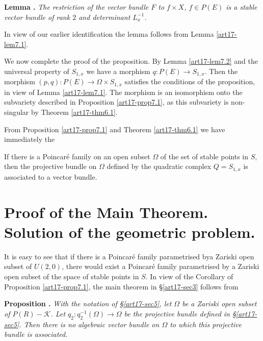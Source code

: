 \medskip
\noindent
{\bf Lemma .\label{art17-lem7.2}}
{\em The restriction of the vector bundle $F$ to $f\times X$, $f\in P(E)$ is a stable vector bundle of rank $2$ and determinant $L^{-1}_{x}$.}
\smallskip

In view of our earlier identification the lemma follows from Lemma \ref{art17-lem7.1}.

We now complete the proof of the proposition. By Lemma \ref{art17-lem7.2} and the universal property of $S_{1,x}$ we have a morphism $q:P(E)\to S_{1,x}$. Then the morphism $(p,q):P(E)\to \Omega\times S_{1,x}$ satisfies the conditions of the proposition, in view of Lemma \ref{art17-lem7.1}. The morphism is an isomorphism onto the subvariety described in Proposition \ref{art17-prop7.1}, as this subvariety is non-singular by Theorem \ref{art17-thm6.1}.

From Proposition \ref{art17-prop7.1} and Theorem \ref{art17-thm6.1} we have immediately the

\begin{coro*}
If there is a Poincar\'e family on an open subset $\Omega$ of the set of stable points in $S$, then the projective bundle on $\Omega$ defined by the quadratic complex $Q=S_{1,x}$ is associated to a vector bundle.
\end{coro*}

\section{Proof of the Main Theorem. Solution of the geometric problem.}\label{art17-sec8}

It is easy to see that if there is a Poincar\'e family parametrised by\pageoriginale a Zariski open subset of $U(2,0)$, there would exist a Poincar\'e family parametrised by a Zariski open subset of the space of stable points in $S$. In view of the Corollary of Proposition \ref{art17-prop7.1}, the main theorem in \S\ref{art17-sec3} follows from

\medskip
\noindent
{\bf Proposition .\label{art17-prop8.1}}
{\em With the notation of \S\ref{art17-sec5}, let $\Omega$ be a Zariski open subset of $P(R)-\mathscr{K}$. Let $q_{2}:q^{-1}_{2}(\Omega)\to \Omega$ be the projective bundle defined in \S\ref{art17-sec5}. Then there is no algebraic vector bundle on $\Omega$ to which this projective bundle is associated.}

